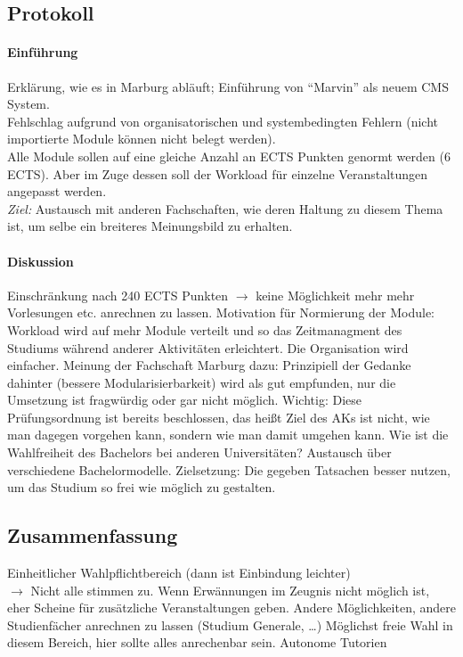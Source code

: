   \subsection*{Protokoll}
    \paragraph{Einführung}
      Erklärung, wie es in Marburg abläuft; Einführung von “Marvin” als neuem CMS System. \\
      Fehlschlag aufgrund von organisatorischen und systembedingten Fehlern (nicht importierte Module können nicht belegt werden). \\
      Alle Module sollen auf eine gleiche Anzahl an ECTS Punkten genormt werden (6 ECTS).
      Aber im Zuge dessen soll der Workload für einzelne Veranstaltungen angepasst werden. \\

      \textit{Ziel:} Austausch mit anderen Fachschaften, wie deren Haltung zu diesem Thema ist, um selbe ein breiteres Meinungsbild zu erhalten.

    \paragraph{Diskussion}
      \begin{outline}
        \1 Einschränkung nach 240 ECTS Punkten $\rightarrow$ keine Möglichkeit mehr mehr Vorlesungen etc. anrechnen zu lassen.
        \1 Motivation für Normierung der Module: Workload wird auf mehr Module verteilt und so das Zeitmanagment des Studiums während anderer Aktivitäten erleichtert. Die Organisation wird einfacher.
        \1 Meinung der Fachschaft Marburg dazu: Prinzipiell der Gedanke dahinter (bessere Modularisierbarkeit) wird als gut empfunden, nur die Umsetzung ist fragwürdig oder gar nicht möglich.
        \1 Wichtig: Diese Prüfungsordnung ist bereits beschlossen, das heißt Ziel des AKs ist nicht, wie man dagegen vorgehen kann, sondern wie man damit umgehen kann.
        \1 Wie ist die Wahlfreiheit des Bachelors bei anderen Universitäten? Austausch über verschiedene Bachelormodelle.
        \1 Zielsetzung: Die gegeben Tatsachen besser nutzen, um das Studium so frei wie möglich zu gestalten.
      \end{outline}

  \subsection*{Zusammenfassung}
    \begin{outline}
      \1 Einheitlicher Wahlpflichtbereich (dann ist Einbindung leichter) \\
        $\rightarrow$ Nicht alle stimmen zu.
      \1 Wenn Erwännungen im Zeugnis nicht möglich ist, eher Scheine für zusätzliche Veranstaltungen geben.
      \1 Andere Möglichkeiten, andere Studienfächer anrechnen zu lassen (Studium Generale, …)
        \2 Möglichst freie Wahl in diesem Bereich, hier sollte alles anrechenbar sein.
        \2 Autonome Tutorien
    \end{outline}
